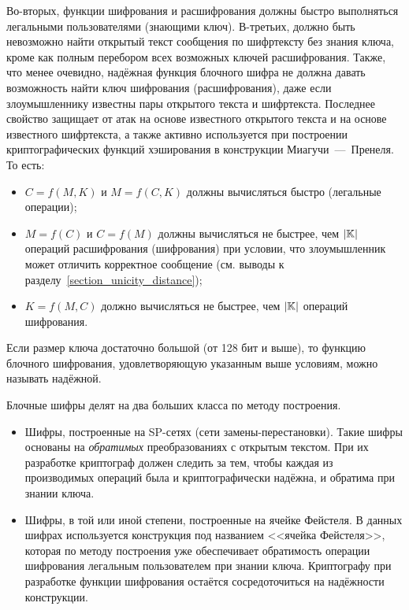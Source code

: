 Во-вторых, функции шифрования и расшифрования должны быстро выполняться легальными пользователями (знающими ключ). В-третьих, должно быть невозможно найти открытый текст сообщения по шифртексту без знания ключа, кроме как полным перебором всех возможных ключей расшифрования. Также, что менее очевидно, надёжная функция блочного шифра не должна давать возможность найти ключ шифрования (расшифрования), даже если злоумышленнику известны пары открытого текста и шифртекста. Последнее свойство защищает от атак на основе известного открытого текста и на основе известного шифртекста, а также активно используется при построении криптографических функций хэширования в конструкции Миагучи~---~Пренеля. То есть:
\begin{itemize}
	\item $C = f \left( M, K \right)$ и $M = f \left( C, K \right)$ должны вычисляться быстро (легальные операции);
	\item $M = f \left( C \right)$ и $C = f \left( M \right)$ должны вычисляться не быстрее, чем $\left| \mathbb{K} \right|$ операций расшифрования (шифрования) при условии, что злоумышленник может отличить корректное сообщение (см. выводы к разделу~\ref{section_unicity_distance});
	\item $K = f \left( M, C \right)$ должно вычисляться не быстрее, чем $\left| \mathbb{K} \right|$ операций шифрования.
\end{itemize}

Если размер ключа достаточно большой (от 128 бит и выше), то функцию блочного шифрования, удовлетворяющую указанным выше условиям, можно называть надёжной.

Блочные шифры делят на два больших класса по методу построения.
\begin{itemize}
	\item Шифры, построенные на SP-сетях (сети замены-пере\-становки). Такие шифры основаны на \emph{обратимых} преобразованиях с открытым текстом. При их разработке криптограф должен следить за тем, чтобы каждая из производимых операций была и криптографически надёжна, и обратима при знании ключа.
	\item Шифры, в той или иной степени, построенные на ячейке Фейстеля. В данных шифрах используется конструкция под названием <<ячейка Фейстеля>>, которая по методу построения уже обеспечивает обратимость операции шифрования легальным пользователем при знании ключа. Криптографу при разработке функции шифрования остаётся сосредоточиться на надёжности конструкции.
\end{itemize}

